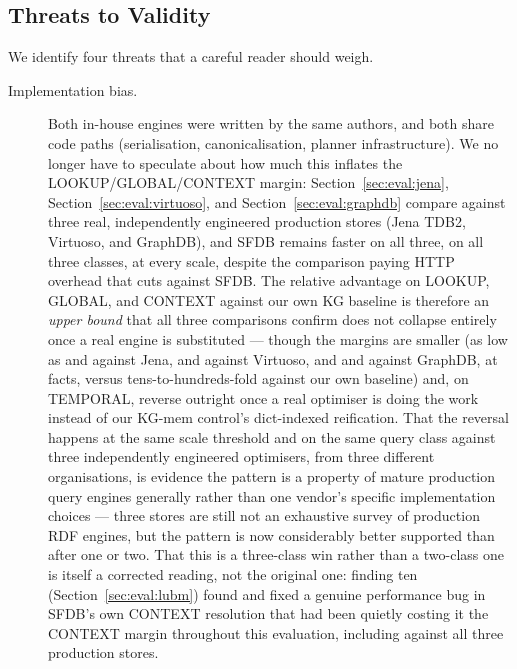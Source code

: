\subsection{Threats to Validity}
\label{sec:discussion:threats}

We identify four threats that a careful reader should weigh.

\begin{description}
    \item[Implementation bias.] Both in-house engines were written by the
          same
          authors, and both share code paths (serialisation,
          canonicalisation, planner infrastructure). We no longer have to
          speculate about how much this inflates the LOOKUP/GLOBAL/CONTEXT
          margin:
          Section~\ref{sec:eval:jena}, Section~\ref{sec:eval:virtuoso}, and
          Section~\ref{sec:eval:graphdb}
          compare against three real, independently engineered
          production stores (Jena TDB2, Virtuoso, and GraphDB), and SFDB
          remains faster on all three, on all three classes, at every scale, despite the comparison
          paying HTTP overhead that cuts against SFDB. The relative
          advantage on LOOKUP, GLOBAL, and CONTEXT against our own KG baseline is
          therefore an \emph{upper bound} that all three comparisons confirm
          does not collapse entirely once a real engine is substituted ---
          though the margins are smaller (as low as \lookupjenalarge{}
          and \globaljenalarge{} against Jena, \lookupvirtuosolarge{}
          and \globalvirtuosolarge{} against Virtuoso, and
          \lookupgraphdblarge{} and \globalgraphdblarge{} against
          GraphDB, at
          \jenalargescale{} facts, versus tens-to-hundreds-fold against
          our own baseline) and, on TEMPORAL, reverse
          outright once a real optimiser is doing the work instead of our
          KG-mem control's dict-indexed reification. That the reversal
          happens at the same scale threshold and on the same query
          class against three independently engineered optimisers, from
          three different organisations, is
          evidence the pattern is a property of mature production query
          engines generally rather than one vendor's specific
          implementation choices --- three stores are still not an
          exhaustive survey of production RDF engines, but the pattern is
          now considerably better supported than after one or two. That
          this is a three-class win rather than a two-class one is itself
          a corrected reading, not the original one: finding ten
          (Section~\ref{sec:eval:lubm}) found and fixed a genuine
          performance bug in SFDB's own CONTEXT resolution that had been
          quietly costing it the CONTEXT margin throughout this
          evaluation, including against all three production stores.


\end{description}
